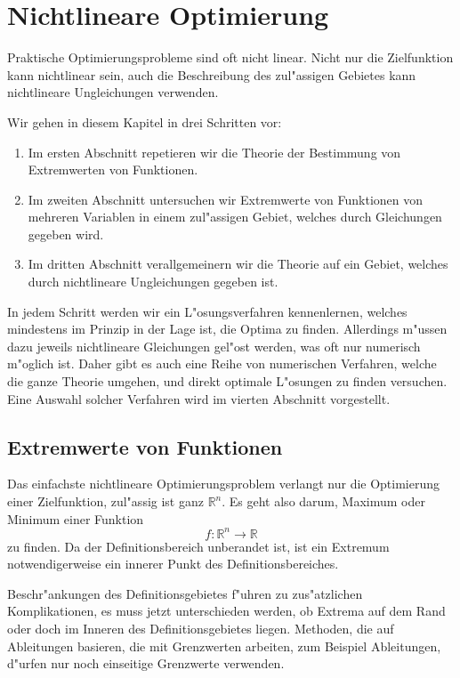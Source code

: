 \chapter{Nichtlineare Optimierung\label{chapter-nichtlineare-optimierung}}
Praktische Optimierungsprobleme sind oft nicht linear. 
Nicht nur die Zielfunktion kann nichtlinear sein, auch die
Beschreibung des zul"assigen Gebietes kann nichtlineare Ungleichungen
verwenden. 

Wir gehen in diesem Kapitel in drei Schritten vor:
\begin{enumerate}
\item Im ersten Abschnitt repetieren wir die Theorie der Bestimmung
von Extremwerten von Funktionen.
\item Im zweiten Abschnitt untersuchen wir Extremwerte von Funktionen
von mehreren Variablen in einem zul"assigen Gebiet, welches durch
Gleichungen gegeben wird.
\item Im dritten Abschnitt verallgemeinern wir die Theorie auf
ein Gebiet, welches durch nichtlineare Ungleichungen gegeben ist.
\end{enumerate}
In jedem Schritt werden wir ein L"osungsverfahren kennenlernen,
welches mindestens im Prinzip in der Lage ist, die Optima zu
finden.
Allerdings m"ussen dazu jeweils nichtlineare Gleichungen
gel"ost werden, was oft nur numerisch m"oglich ist.
Daher gibt es auch eine Reihe von numerischen Verfahren, welche die ganze
Theorie umgehen, und direkt optimale L"osungen zu finden versuchen.
Eine Auswahl solcher Verfahren wird im vierten Abschnitt vorgestellt.

\section{Extremwerte von Funktionen\label{nlp:extremwerte}}
Das einfachste nichtlineare Optimierungsproblem verlangt nur die
Optimierung einer Zielfunktion, zul"assig ist ganz $\mathbb R^n$.
Es geht also darum, Maximum oder Minimum einer Funktion
\[
f\colon \mathbb R^n\to\mathbb R
\]
zu finden. Da der Definitionsbereich unberandet ist, ist ein
Extremum notwendigerweise ein innerer Punkt des Definitionsbereiches.

Beschr"ankungen des Definitionsgebietes f"uhren
zu zus"atzlichen Komplikationen, es muss jetzt unterschieden
werden, ob Extrema auf dem Rand oder doch im Inneren des Definitionsgebietes
liegen.
Methoden, die auf Ableitungen basieren, die mit Grenzwerten
arbeiten, zum Beispiel Ableitungen, d"urfen nur noch einseitige
Grenzwerte verwenden.

